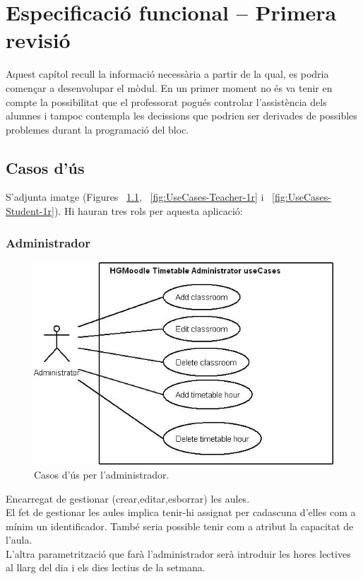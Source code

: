 \documentclass[a4paper]{report}  %
\begin{document}
\chapter{Especificació funcional – Primera revisió}
Aquest capítol recull la informació necessària a partir de la qual, es podria començar a desenvolupar el mòdul. En un primer moment no és va tenir en compte la possibilitat que el professorat pogués controlar l'assistència dels alumnes i tampoc contempla les decissions que podrien ser derivades de possibles problemes durant la programació del bloc.
\section{Casos d'ús}
S’adjunta imatge (Figures ~\ref{fig:UseCases-Administrator-1r}, ~\ref{fig:UseCases-Teacher-1r} i ~\ref{fig:UseCases-Student-1r}). Hi hauran tres rols per aquesta aplicació:
\subsection{Administrador}
		\begin{figure}[H] %
		\begin{center}
		\includegraphics[width=14cm,keepaspectratio]{img/UseCases-Administrator-1r.jpg}
		\caption[List caption]{Casos d'ús per l'administrador.}
		\label{fig:UseCases-Administrator-1r}
		\end{center}
		\end{figure}
Encarregat de gestionar (crear,editar,esborrar) les aules.\\
El fet de gestionar les aules implica tenir-hi assignat per cadascuna d’elles com a mínim un identificador. També seria possible tenir com a atribut la capacitat de l’aula.\\
L'altra parametrització que farà l'administrador serà introduir les hores lectives al llarg del dia i els dies lectius de la setmana.\\
\end{document}
